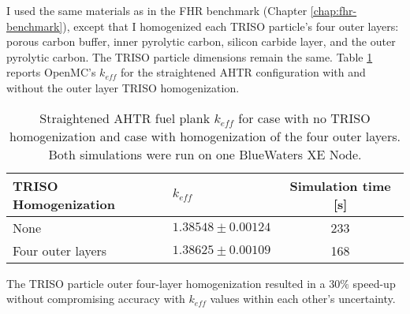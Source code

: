 I used the same materials as in the \gls{FHR} benchmark (Chapter \ref{chap:fhr-benchmark}), 
except that I homogenized each \gls{TRISO} particle's four outer layers: 
porous carbon buffer, inner pyrolytic carbon, silicon carbide layer, and the 
outer pyrolytic carbon. 
The \gls{TRISO} particle dimensions remain the same.
Table \ref{tab:keff_triso} reports OpenMC's $k_{eff}$ for the straightened \gls{AHTR} configuration 
with and without the outer layer \gls{TRISO} homogenization.
\begin{table}[htbp]
    \centering
    \onehalfspacing
    \caption{Straightened \acrfull{AHTR} fuel plank $k_{eff}$ for case with 
    no \gls{TRISO} homogenization and case with homogenization of the four outer 
    layers. Both simulations were run on one BlueWaters XE Node.}
	\label{tab:keff_triso}
    \footnotesize
    \begin{tabular}{llc}
    \hline 
    \textbf{TRISO Homogenization}& \textbf{$k_{eff}$} & \textbf{Simulation time [s]}  \\
    \hline 
    None & $1.38548 \pm 0.00124$ & 233\\ 
    Four outer layers & $1.38625 \pm 0.00109$ & 168\\ 
    \hline
    \end{tabular}
\end{table}
The \gls{TRISO} particle outer four-layer homogenization resulted in a $30\%$ 
speed-up without compromising accuracy with $k_{eff}$ values within each 
other's uncertainty.

